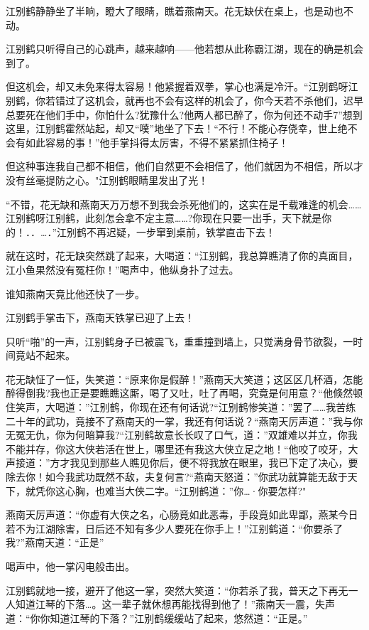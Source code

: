\documentclass[12pt,oneside]{book}
\begin{document}
江别鹤静静坐了半晌，瞪大了眼睛，瞧着燕南天。花无缺伏在桌上，也是动也不动。

江别鹤只听得自己的心跳声，越来越响------他若想从此称霸江湖，现在的确是机会到了。

但这机会，却又未免来得太容易！他紧握着双拳，掌心也满是冷汗。``江别鹤呀江别鹤，你若错过了这机会，就再也不会有这样的机会了，你今天若不杀他们，迟早总要死在他们手中，你怕什么?犹豫什么?他两人都已醉了，你为何还不动手7''想到这里，江别鹤霍然站起，却又``噗''地坐了下去！``不行！不能心存侥幸，世上绝不会有如此容易的事！''他手掌抖得太厉害，不得不紧紧抓住椅子！

但这种事连我自己都不相信，他们自然更不会相信了，他们就因为不相信，所以才没有丝毫提防之心。"江别鹤眼睛里发出了光！

``不错，花无缺和燕南天万万想不到我会杀死他们的，这实在是千载难逢的机会\ldots\ldots 江别鹤呀江别鹤，此刻怎会拿不定主意\ldots\ldots?你现在只要一出手，天下就是你的！．．\ldots．''江别鹤不再迟疑，一步窜到桌前，铁掌直击下去！

就在这时，花无缺突然跳了起来，大喝道：``江别鹤，我总算瞧清了你的真面目，江小鱼果然没有冤枉你！''喝声中，他纵身扑了过去。

谁知燕南天竟比他还快了一步。

江别鹤手掌击下，燕南天铁掌已迎了上去！

只听``啪''的一声，江别鹤身子已被震飞，重重撞到墙上，只觉满身骨节欲裂，一时间竟站不起来。

花无缺怔了一怔，失笑道：``原来你是假醉！''燕南天大笑道；这区区几杯酒，怎能醉得倒我?我也正是要瞧瞧这厮，喝了又吐，吐了再喝，究竟是何用意？``他倏然顿住笑声，大喝道：''江别鹤，你现在还有何话说?``江别鹤惨笑道：''罢了\ldots\ldots 我苦练二十年的武功，竟接不了燕南天的一掌，我还有何话说？``燕南天厉声道：''我与你无冤无仇，你为何暗算我?``江别鹤故意长长叹了口气，道：''双雄难以并立，你我不能并存，你这大侠若活在世上，哪里还有我这大侠立足之地！``他咬了咬牙，大声接道：''方才我见到那些人瞧见你后，便不将我放在眼里，我已下定了决心，要除去你！如今我武功既然不敌，夫复何言?``燕南天怒道：''你武功就算能无敌于天下，就凭你这心胸，也难当大侠二字。``江别鹤道：''你\ldots·你要怎样?"

燕南天厉声道：``你虚有大侠之名，心肠竟如此恶毒，手段竟如此卑鄙，燕某今日若不为江湖除害，日后还不知有多少人要死在你手上！''江别鹤道：``你要杀了我?''燕南天道：``正是''

喝声中，他一掌闪电般击出。

江别鹤就地一接，避开了他这一掌，突然大笑道：``你若杀了我，普天之下再无一人知道江琴的下落\ldots。这一辈子就休想再能找得到他了！''燕南天一震，失声道：``你你知道江琴的下落？''江别鹤缓缓站了起来，悠然道：``正是。''
\end{document}

